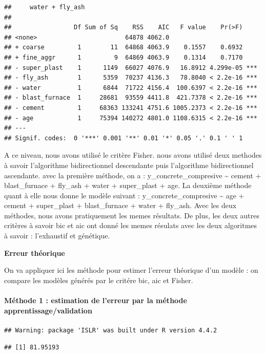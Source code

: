 \documentclass[
  12pt,
]{article}
\begin{document}
\begin{verbatim}
##     water + fly_ash
## 
##                 Df Sum of Sq    RSS    AIC   F value    Pr(>F)    
## <none>                        64878 4062.0                        
## + coarse         1        11  64868 4063.9    0.1557    0.6932    
## + fine_aggr      1         9  64869 4063.9    0.1314    0.7170    
## - super_plast    1      1149  66027 4076.9   16.8912 4.299e-05 ***
## - fly_ash        1      5359  70237 4136.3   78.8040 < 2.2e-16 ***
## - water          1      6844  71722 4156.4  100.6397 < 2.2e-16 ***
## - blast_furnace  1     28681  93559 4411.8  421.7378 < 2.2e-16 ***
## - cement         1     68363 133241 4751.6 1005.2373 < 2.2e-16 ***
## - age            1     75394 140272 4801.0 1108.6315 < 2.2e-16 ***
## ---
## Signif. codes:  0 '***' 0.001 '**' 0.01 '*' 0.05 '.' 0.1 ' ' 1
\end{verbatim}

A ce niveau, nous avons utilisé le critère Fisher. nous avons utilisé
deux methodes à savoir l'algorithme bidirectionnel descendante puis
l'algorithme bidirectionnel ascendante. avec la première méthode, on a :
y\_concrete\_compresive \textasciitilde{} cement + blast\_furnace +
fly\_ash + water + super\_plast + age. La deuxième méthode quant à elle
nous donne le modèle suivant : y\_concrete\_compresive \textasciitilde{}
age + cement + super\_plast + blast\_furnace + water + fly\_ash. Avec
les deux méthodes, nous avons pratiquement les memes résultats. De plus,
les deux autres critères à savoir bic et aic ont donné les memes
résulats avec les deux algoritmes à savoir : l'exhaustif et génétique.

\textbf{Erreur théorique}

On va appliquer ici les méthode pour estimer l'erreur théorique d'un
modèle : on compare les modèles générés par le critére bic, aic et
Fisher.

\paragraph{Méthode 1 : estimation de l'erreur par la méthode
apprentissage/validation}\label{muxe9thode-1-estimation-de-lerreur-par-la-muxe9thode-apprentissagevalidation}

\begin{verbatim}
## Warning: package 'ISLR' was built under R version 4.4.2
\end{verbatim}

\begin{verbatim}
## [1] 81.95193
\end{verbatim}
\end{document}
